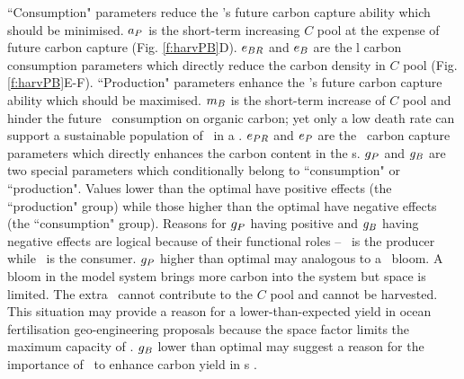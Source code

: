 \documentclass[../thesis.tex]{subfiles} %
\begin{document}
``Consumption" parameters reduce the \pbs's future carbon capture ability which should be minimised.  $a_P$ is the short-term increasing $C$ pool at the expense of future carbon capture (Fig. \ref{f:harvPB}D).  $e_{BR}$ and $e_B$ are the \bac l carbon consumption parameters which directly reduce the carbon density in $C$ pool (Fig. \ref{f:harvPB}E-F).  ``Production" parameters enhance the \pbs's future carbon capture ability which should be maximised.  $m_B$ is the short-term increase of $C$ pool and hinder the future \bac\ consumption on organic carbon; yet only a low death rate can support a sustainable population of \bac\ in a \pbs. $e_{PR}$ and $e_P$ are the \phy\ carbon capture parameters which directly enhances the carbon content in the \pbs s.  $g_P$ and $g_B$ are two special parameters which conditionally belong to ``consumption" or ``production".  Values lower than the optimal have positive effects (the ``production" group) while those higher than the optimal have negative effects (the ``consumption" group).  Reasons for $g_P$ having positive and $g_B$ having negative effects are logical because of their functional roles -- \phy\ is the producer while \bac\ is the consumer.  $g_P$ higher than optimal may analogous to a \phy\ bloom.  A bloom in the model system brings more carbon into the system but space is limited.  The extra \phy\ cannot contribute to the $C$ pool and cannot be harvested.  This situation may provide a reason for a lower-than-expected yield in ocean fertilisation geo-engineering proposals \autocite{boyd2008implications,gnanadesikan2008export,oschlies2010side} because the space factor limits the maximum capacity of \phy.  $g_B$ lower than optimal may suggest a reason for the importance of \bac\ to enhance carbon yield in \pbs s \autocite{fuentes2016impact,santos2014microalgal}.
\end{document}

